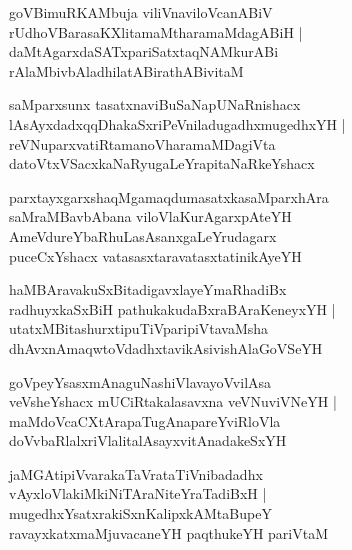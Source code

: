 \documentclass[twoside,12pt,openright]{book}
\newcounter{shloka}[chapter]
\begin{document}
\begin{shloka}%
goVBimuRKAMbuja viliVnaviloVcanABiV \\
rUdhoVBarasaKXlitamaMtharamaMdagABiH |\\
daMtAgarxdaSATxpariSatxtaqNAMkurABi \\
rAlaMbivbAladhilatABirathABivitaM 
\end{shloka}

\begin{shloka}%
saMparxsunx tasatxnaviBuSaNapUNaRnishacx \\
lAsAyxdadxqqDhakaSxriPeVniladugadhxmugedhxYH |\\
reVNuparxvatiRtamanoVharamaMDagiVta \\
datoVtxVSacxkaNaRyugaLeYrapitaNaRkeYshacx
\end{shloka}

\begin{shloka}%
parxtayxgarxshaqMgamaqdumasatxkasaMparxhAra \\
saMraMBavbAbana viloVlaKurAgarxpAteYH \\
AmeVdureYbaRhuLasAsanxgaLeYrudagarx \\
puceCxYshacx vatasasxtaravatasxtatinikAyeYH 
\end{shloka}

\begin{shloka}%
haMBAravakuSxBitadigavxlayeYmaRhadiBx \\
radhuyxkaSxBiH pathukakudaBxraBAraKeneyxYH |\\
utatxMBitashurxtipuTiVparipiVtavaMsha \\
dhAvxnAmaqwtoVdadhxtavikAsivishAlaGoVSeYH 
\end{shloka}

\begin{shloka}%
goVpeyYsasxmAnaguNashiVlavayoVvilAsa \\
veVsheYshacx mUCiRtakalasavxna veVNuviVNeYH |\\
maMdoVcaCXtArapaTugAnapareYviRloVla \\
doVvbaRlalxriVlalitalAsayxvitAnadakeSxYH
\end{shloka}

\begin{shloka}%
jaMGAtipiVvarakaTaVrataTiVnibadadhx \\
vAyxloVlakiMkiNiTAraNiteYraTadiBxH |\\
mugedhxYsatxrakiSxnKalipxkAMtaBupeY \\
ravayxkatxmaMjuvacaneYH paqthukeYH pariVtaM 
\end{shloka}
\end{document}
